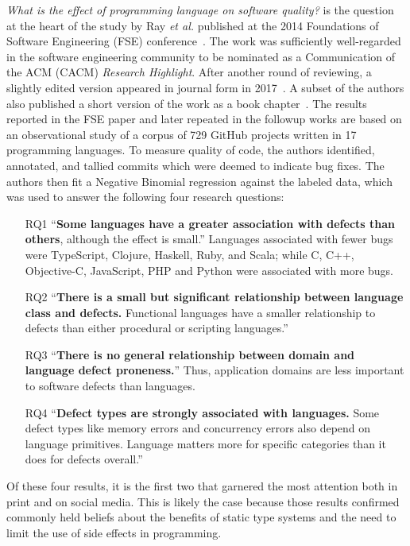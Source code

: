 \documentclass[acmsmall]{acmart}
\renewcommand{\c}{{\sf  C}\xspace}
\newcommand{\objc}{{\sf  Objective-C}\xspace}
\newcommand{\cpp}{{\sf  C++}\xspace}
\newcommand{\python}{{\sf  Python}\xspace}
\newcommand{\ruby}{{\sf  Ruby}\xspace}
\newcommand{\scala}{{\sf  Scala}\xspace}
\newcommand{\ts}{{\sf  TypeScript}\xspace}
\newcommand{\js}{{\sf  JavaScript}\xspace}
\newcommand{\haskell}{{\sf  Haskell}\xspace}
\newcommand{\php}{{\sf  PHP}\xspace}
\newcommand{\clojure}{{\sf  Clojure}\xspace}
\newcommand{\gh}{{GitHub}\xspace}
\newcommand{\ea}{\emph{et al.}\xspace}
\begin{document}
\emph{What is the effect of programming language on software quality?} is
the question at the heart of the study by Ray \ea published at the 2014
Foundations of Software Engineering (FSE) conference~\cite{ray14}. The work
was sufficiently well-regarded in the software engineering community to be
nominated as a Communication of the ACM (CACM) \emph{Research Highlight}.
After another round of reviewing, a slightly edited version appeared
in journal form in 2017~\cite{ray17}. A subset of the authors also published
a short version of the work as a book chapter~\cite{book}.  The results
reported in the FSE paper and later repeated in the followup works are based
on an observational study of a corpus of 729 \gh projects written in 17
programming languages. To measure quality of code, the authors identified,
annotated, and tallied commits which were deemed to indicate bug fixes. The
authors then fit a Negative Binomial regression against the labeled data,
which was used to answer the following four research questions:
\begin{enumerate}
\item[RQ1] ``{\bf Some languages have a greater association with defects
  than others}, although the effect is small.'' Languages associated with
  fewer bugs were \ts, \clojure, \haskell, \ruby, and \scala; while \c,
  \cpp, \objc, \js, \php and \python were associated with more bugs.
\item[RQ2] ``{\bf There is a small but significant relationship between
  language class and defects.} Functional languages have a smaller
  relationship to defects than either procedural or scripting languages.''
\item[RQ3] ``{\bf There is no general relationship between domain and
  language defect proneness.}'' Thus, application domains are less important
  to software defects than languages.
\item[RQ4] ``{\bf Defect types are strongly associated with languages.} Some
  defect types like memory errors and concurrency errors also depend on language
  primitives. Language matters more for specific categories than it does for
  defects overall.''
\end{enumerate}
Of these four results, it is the first two that garnered the most attention
both in print and on social media. This is likely the case because those
results confirmed commonly held beliefs about the benefits of static type
systems and the need to limit the use of side effects in programming.
\end{document}
